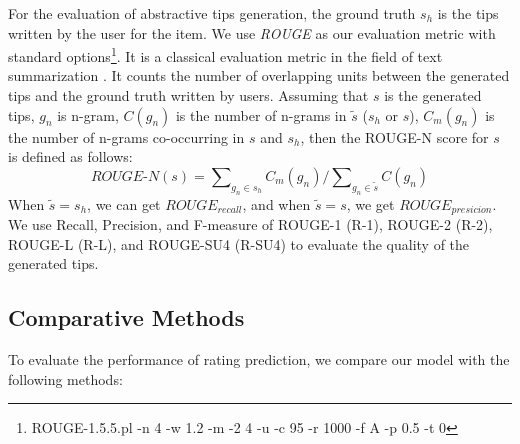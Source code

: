 \documentclass[sigconf]{acmart}
\begin{document}
For the evaluation of abstractive tips generation, the ground truth $s_h$ is the
tips written by the user for the item.
We use \textit{ROUGE} \cite{lin2004rouge} as our evaluation metric with standard options\footnote{ROUGE-1.5.5.pl -n 4 -w 1.2 -m -2 4 -u -c 95 -r 1000 -f A -p 0.5 -t 0}. It is a classical evaluation metric in the field of text summarization \cite{lin2004rouge,lidong15absmds}.
It counts the number of overlapping units between the generated tips and the ground truth written by users. Assuming that $s$ is the generated tips, $g_n$ is n-gram, ${C}({g_n})$ is the number of n-grams in $\tilde s$ ($s_h$ or $s$), ${C_m}({g_n})$ is the number of n-grams co-occurring in $s$ and $s_h$, then the ROUGE-N score for $s$ is defined as follows:
\begin{equation}
{ROUGE\textrm{-}N}(s) = \sum\nolimits_{{g_n} \in {s_h}} {{C_m}({g_n})/\sum\nolimits_{{g_n} \in {\tilde s}} {C({g_n})} }
\end{equation}
When $\tilde s = s_h$, we can get $ROUGE_{recall}$, and when $\tilde s = s$, we get $ROUGE_{presicion}$.  We use Recall, Precision, and F-measure of ROUGE-1 (R-1), ROUGE-2 (R-2), ROUGE-L (R-L), and ROUGE-SU4 (R-SU4) to evaluate the quality of the generated tips.


\subsection{Comparative Methods}

To evaluate the performance of rating prediction, we compare our model with the following methods:
\end{document}
